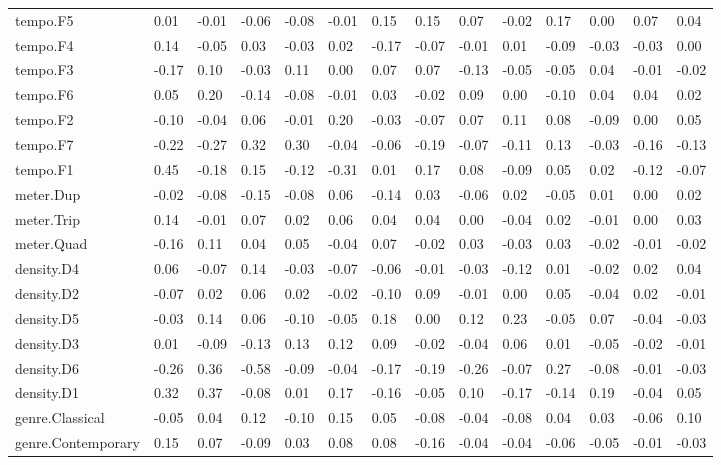 \documentclass[
]{article}
\newenvironment{lltable}{\begin{landscape}\begin{center}\begin{ThreePartTable}}{\end{ThreePartTable}\end{center}\end{landscape}}
\begin{document}
\begin{lltable}
{\begin{longtable}{llllllllllllll}
tempo.F5 & 0.01 & -0.01 & -0.06 & -0.08 & -0.01 & 0.15 & 0.15 & 0.07 & -0.02 & 0.17 & 0.00 & 0.07 & 0.04\\
tempo.F4 & 0.14 & -0.05 & 0.03 & -0.03 & 0.02 & -0.17 & -0.07 & -0.01 & 0.01 & -0.09 & -0.03 & -0.03 & 0.00\\
tempo.F3 & -0.17 & 0.10 & -0.03 & 0.11 & 0.00 & 0.07 & 0.07 & -0.13 & -0.05 & -0.05 & 0.04 & -0.01 & -0.02\\
tempo.F6 & 0.05 & 0.20 & -0.14 & -0.08 & -0.01 & 0.03 & -0.02 & 0.09 & 0.00 & -0.10 & 0.04 & 0.04 & 0.02\\
tempo.F2 & -0.10 & -0.04 & 0.06 & -0.01 & 0.20 & -0.03 & -0.07 & 0.07 & 0.11 & 0.08 & -0.09 & 0.00 & 0.05\\
tempo.F7 & -0.22 & -0.27 & 0.32 & 0.30 & -0.04 & -0.06 & -0.19 & -0.07 & -0.11 & 0.13 & -0.03 & -0.16 & -0.13\\
tempo.F1 & 0.45 & -0.18 & 0.15 & -0.12 & -0.31 & 0.01 & 0.17 & 0.08 & -0.09 & 0.05 & 0.02 & -0.12 & -0.07\\
meter.Dup & -0.02 & -0.08 & -0.15 & -0.08 & 0.06 & -0.14 & 0.03 & -0.06 & 0.02 & -0.05 & 0.01 & 0.00 & 0.02\\
meter.Trip & 0.14 & -0.01 & 0.07 & 0.02 & 0.06 & 0.04 & 0.04 & 0.00 & -0.04 & 0.02 & -0.01 & 0.00 & 0.03\\
meter.Quad & -0.16 & 0.11 & 0.04 & 0.05 & -0.04 & 0.07 & -0.02 & 0.03 & -0.03 & 0.03 & -0.02 & -0.01 & -0.02\\
density.D4 & 0.06 & -0.07 & 0.14 & -0.03 & -0.07 & -0.06 & -0.01 & -0.03 & -0.12 & 0.01 & -0.02 & 0.02 & 0.04\\
density.D2 & -0.07 & 0.02 & 0.06 & 0.02 & -0.02 & -0.10 & 0.09 & -0.01 & 0.00 & 0.05 & -0.04 & 0.02 & -0.01\\
density.D5 & -0.03 & 0.14 & 0.06 & -0.10 & -0.05 & 0.18 & 0.00 & 0.12 & 0.23 & -0.05 & 0.07 & -0.04 & -0.03\\
density.D3 & 0.01 & -0.09 & -0.13 & 0.13 & 0.12 & 0.09 & -0.02 & -0.04 & 0.06 & 0.01 & -0.05 & -0.02 & -0.01\\
density.D6 & -0.26 & 0.36 & -0.58 & -0.09 & -0.04 & -0.17 & -0.19 & -0.26 & -0.07 & 0.27 & -0.08 & -0.01 & -0.03\\
density.D1 & 0.32 & 0.37 & -0.08 & 0.01 & 0.17 & -0.16 & -0.05 & 0.10 & -0.17 & -0.14 & 0.19 & -0.04 & 0.05\\
genre.Classical & -0.05 & 0.04 & 0.12 & -0.10 & 0.15 & 0.05 & -0.08 & -0.04 & -0.08 & 0.04 & 0.03 & -0.06 & 0.10\\
genre.Contemporary & 0.15 & 0.07 & -0.09 & 0.03 & 0.08 & 0.08 & -0.16 & -0.04 & -0.04 & -0.06 & -0.05 & -0.01 & -0.03\\

\end{longtable}}
\end{lltable}
\end{document}
